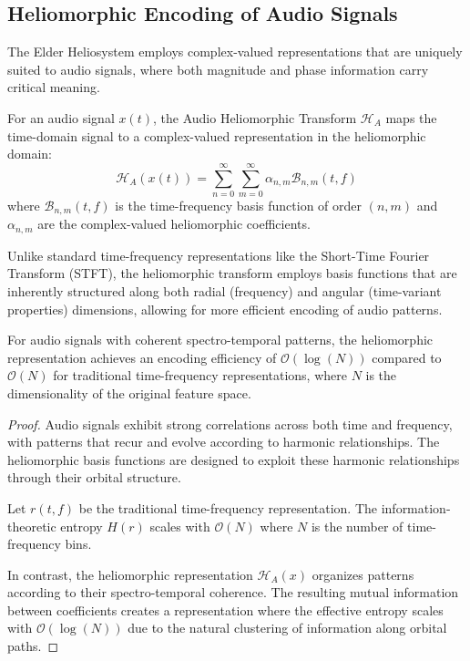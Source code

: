 \subsection{Heliomorphic Encoding of Audio Signals}

The Elder Heliosystem employs complex-valued representations that are uniquely suited to audio signals, where both magnitude and phase information carry critical meaning.

\begin{definition}
For an audio signal $x(t)$, the Audio Heliomorphic Transform $\mathcal{H}_A$ maps the time-domain signal to a complex-valued representation in the heliomorphic domain:
\begin{equation}
\mathcal{H}_A(x(t)) = \sum_{n=0}^{\infty} \sum_{m=0}^{\infty} \alpha_{n,m} \mathcal{B}_{n,m}(t, f) 
\end{equation}
where $\mathcal{B}_{n,m}(t, f)$ is the time-frequency basis function of order $(n,m)$ and $\alpha_{n,m}$ are the complex-valued heliomorphic coefficients.
\end{definition}

Unlike standard time-frequency representations like the Short-Time Fourier Transform (STFT), the heliomorphic transform employs basis functions that are inherently structured along both radial (frequency) and angular (time-variant properties) dimensions, allowing for more efficient encoding of audio patterns.

\begin{theorem}
For audio signals with coherent spectro-temporal patterns, the heliomorphic representation achieves an encoding efficiency of $\mathcal{O}(\log(N))$ compared to $\mathcal{O}(N)$ for traditional time-frequency representations, where $N$ is the dimensionality of the original feature space.
\end{theorem}

\begin{proof}
Audio signals exhibit strong correlations across both time and frequency, with patterns that recur and evolve according to harmonic relationships. The heliomorphic basis functions are designed to exploit these harmonic relationships through their orbital structure.

Let $r(t, f)$ be the traditional time-frequency representation. The information-theoretic entropy $H(r)$ scales with $\mathcal{O}(N)$ where $N$ is the number of time-frequency bins. 

In contrast, the heliomorphic representation $\mathcal{H}_A(x)$ organizes patterns according to their spectro-temporal coherence. The resulting mutual information between coefficients creates a representation where the effective entropy scales with $\mathcal{O}(\log(N))$ due to the natural clustering of information along orbital paths.
\end{proof}

